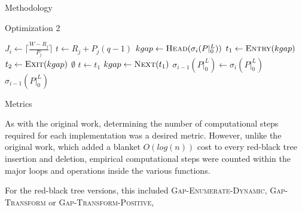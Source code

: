 \documentclass{article}
\begin{document}
\begin{section}{Methodology}
\begin{subsection}{Optimization 2}
\begin{algorithm}[H]
\begin{algorithmic}[2]
          \State $J_{i} \gets \lceil\frac{W - R_{j}}{P_{j}}\rceil$
            \State $t \gets R_{j} + P_{j}(q-1)$
            \State $kgap \gets \Call{Head}{\sigma_{i}(P|_{0}^{L})}$
            \State $t_{1} \gets \Call{Entry}{kgap}$
            \State $t_{2} \gets \Call{Exit}{kgap}$
                \State \Return $\emptyset$
              \EndIf
                \State $t \gets t_{1}$
              \EndIf
                    \State {$[t_{1},t_{2}) \gets [t_{1},t)$}
                  \Else
                    \State {\Call{Splice-Out}{$\sigma_{i}(P|_{0}^{L}), [t_{1},t_{2})$}}
                  \EndIf
                    \ExitWhile
                  \EndIf
                \EndIf
                    \State {$[t_{1},t_{2}) \gets [t + C_{j},t_{2})$}
                      \State \Call{Splice-In}{$\sigma_{i}(P|_{0}^{L}), [t_{1},t)$}
                    \EndIf
                  \ExitWhile
                \EndIf
              \EndIf
                \State $kgap \gets \Call{Next}{t_{1}}$
              \EndIf
            \EndWhile
          \EndFor
          \State $\sigma_{i-1}(P|_{0}^{L}) \gets \sigma_{i}(P|_{0}^{L})$
          \State \Return $\sigma_{i-1}(P|_{0}^{L})$
        \EndFunction
      \end{algorithmic}
      \end{algorithm}
  \end{subsection}
  \begin{subsection}{Metrics}
    \begin{paragraph}{}
      As with the original work, determining the number of computational steps required for
      each implementation was a desired metric. However, unlike the original work, which
      added a blanket $O(log(n))$ cost to every red-black tree insertion and deletion\autocite[14]{BelwalCheng},
      empirical computational steps were counted within the major loops and operations
      inside the various functions.
    \end{paragraph}
    \begin{paragraph}{}
      For the red-black tree versions, this included
      \textsc{Gap-Enumerate-Dynamic}, \textsc{Gap-Transform} or \textsc{Gap-Transform-Positive},

\end{paragraph}
\end{subsection}
\end{section}
\end{document}
